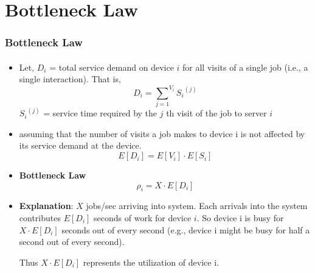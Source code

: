 \documentclass{beamer}
\begin{document}
\section{  Bottleneck Law}

\begin{frame}
\frametitle{  Bottleneck Law}
\framesubtitle{\textbf{\textit{}}}
\begin{itemize}
\item Let, $D_i$ =  total service demand on device $i$ for all visits of a single job (i.e., a single interaction). That is,
$$D_i = {{\sum}_{j=1}}^{V_i} {S_i}^{(j)}$$
${S_i}^{(j)}$ = service time required by the $j$ th visit of the job to server $i$
\item  assuming that the number of visits a job makes to device i is not affected by its service demand at the device.
$$E [D_i ] = E [V_i ] \cdot E [S_i ]$$

\item \textbf{Bottleneck Law} 
$$ {\rho}_i = X \cdot E[D_i] $$

\item  \textbf{Explanation}: $X$ jobs/sec arriving into system. Each  arrivals
into the system contributes $E [D_i ]$ seconds of work for device $i$. So device i is busy for $X \cdot E [D_i ]$ seconds out of every second (e.g., device i might be busy for half a second
out of every second). 

Thus $X \cdot E [D_i ]$ represents the utilization of device i.



\end{itemize}
	
\end{frame}
    
\end{document}
